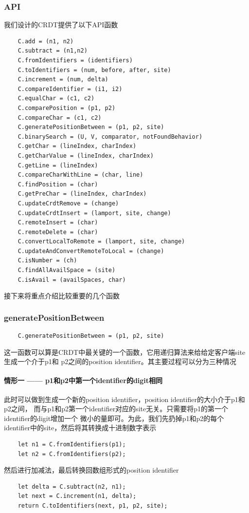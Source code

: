 \documentclass[11pt]{ctexart}
\begin{document}
\subsubsection{API}
我们设计的CRDT提供了以下API函数
\begin{verbatim}
    C.add = (n1, n2)
    C.subtract = (n1,n2)
    C.fromIdentifiers = (identifiers)
    C.toIdentifiers = (num, before, after, site)
    C.increment = (num, delta)
    C.compareIdentifier = (i1, i2)
    C.equalChar = (c1, c2)
    C.comparePosition = (p1, p2)
    C.compareChar = (c1, c2)
    C.generatePositionBetween = (p1, p2, site)
    C.binarySearch = (U, V, comparator, notFoundBehavior)
    C.getChar = (lineIndex, charIndex)
    C.getCharValue = (lineIndex, charIndex)
    C.getLine = (lineIndex)
    C.compareCharWithLine = (char, line)
    C.findPosition = (char)
    C.getPreChar = (lineIndex, charIndex)
    C.updateCrdtRemove = (change)
    C.updateCrdtInsert = (lamport, site, change)
    C.remoteInsert = (char)
    C.remoteDelete = (char)
    C.convertLocalToRemote = (lamport, site, change)
    C.updateAndConvertRemoteToLocal = (change)
    C.isNumber = (ch)
    C.findAllAvailSpace = (site)
    C.isAvail = (availSpaces, char)
\end{verbatim}

接下来将重点介绍比较重要的几个函数
 
\subsubsection{\textsf{generatePositionBetween}}
\begin{verbatim}
    C.generatePositionBetween = (p1, p2, site)
\end{verbatim}

这一函数可以算是CRDT中最关键的一个函数，它用递归算法来给给定客户端\textsf{site}生成一个介于\textsf{p1}和
\textsf{p2}之间的position identifier。其主要过程可以分为三种情况
\paragraph{情形一 —— p1和p2中第一个identifier的digit相同}
此时可以做到生成一个新的position identifier，position identifier的大小介于p1和p2之间，
而与p1和p2第一个identifier对应的site无关。只需要将p1的第一个identifier的digit增加一个
微小的量即可。为此，我们先扔掉p1和p2的每个identifier中的site，然后将其转换成十进制数字表示
\begin{verbatim}
    let n1 = C.fromIdentifiers(p1);
    let n2 = C.fromIdentifiers(p2);
\end{verbatim}
然后进行加减法，最后转换回数组形式的position identifier
\begin{verbatim}
    let delta = C.subtract(n2, n1);
    let next = C.increment(n1, delta);
    return C.toIdentifiers(next, p1, p2, site);
\end{verbatim}
\end{document}
